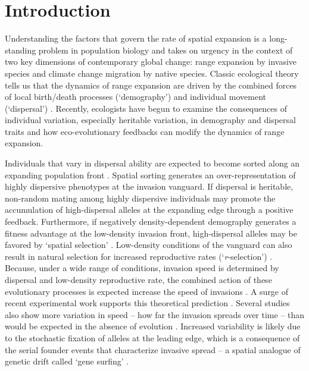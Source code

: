 \documentclass[11pt]{article}
\begin{document}
\newpage{}

\section*{Introduction}
Understanding the factors that govern the rate of spatial expansion is a long-standing problem in population biology and takes on urgency in the context of two key dimensions of contemporary global change: range expansion by invasive species and climate change migration by native species.
Classic ecological theory tells us that the dynamics of range expansion are driven by the combined forces of local birth/death processes (`demography') and individual movement (`dispersal') \citep{skellam_random_1951,okubo_diffusion_1980,kot_discrete-time_1986,kot_dispersal_1996}.
Recently, ecologists have begun to examine the consequences of individual variation, especially heritable variation, in demography and dispersal traits and how eco-evolutionary feedbacks can modify the dynamics of range expansion. 

Individuals that vary in dispersal ability are expected to become sorted along an expanding population front \citep{shine_evolutionary_2011}.
Spatial sorting generates an over-representation of highly dispersive phenotypes at the invasion vanguard.
If dispersal is heritable, non-random mating among highly dispersive individuals may promote the accumulation of high-dispersal alleles at the expanding edge through a positive feedback.
Furthermore, if negatively density-dependent demography generates a fitness advantage at the low-density invasion front, high-dispersal alleles may be favored by `spatial selection' \citep{phillips_life-history_2010, perkins_evolution_2013}.
Low-density conditions of the vanguard can also result in natural selection for increased reproductive rates (`\textit{r}-selection’) \citep{phillips_life-history_2010}.
Because, under a wide range of conditions, invasion speed is determined by dispersal and low-density reproductive rate, the combined action of these evolutionary processes is expected increase the speed of invasions \citep{phillips_evolutionary_2015}. A surge of recent experimental work supports this theoretical prediction \citep{williams_rapid_2016, ochocki_rapid_2017, weiss-lehman_rapid_2017,van2018kin}.
Several studies also show more variation in speed -- how far the invasion spreads over time -- than would be expected in the absence of evolution \citep{phillips_evolutionary_2015, ochocki_rapid_2017, weiss-lehman_rapid_2017}.
Increased variability is likely due to the stochastic fixation of alleles at the leading edge, which is a consequence of the serial founder events that characterize invasive spread -- a spatial analogue of genetic drift called `gene surfing' \citep{edmonds_mutations_2004,klopfstein_fate_2006,excoffier_surfing_2008,peischl_expansion_2015,phillips_evolutionary_2015, ochocki_rapid_2017, weiss-lehman_rapid_2017}.
\end{document}
